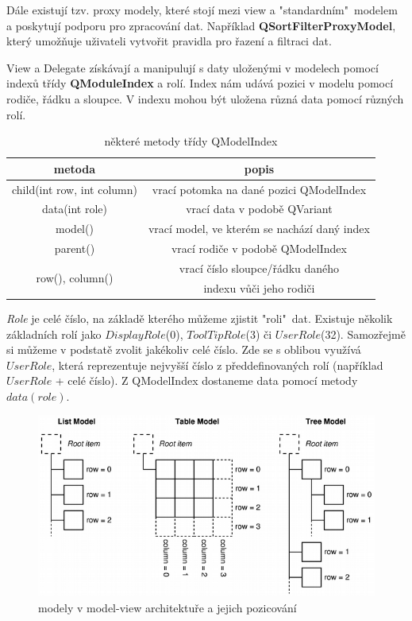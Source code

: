 Dále existují tzv. proxy modely, které stojí mezi view a
"standardním"~modelem a poskytují podporu pro zpracování dat.
Například \textbf{QSortFilterProxyModel}, který umožňuje uživateli
vytvořit pravidla pro řazení a filtraci dat.

View a Delegate získávají a manipulují s daty uloženými v modelech
pomocí indexů třídy \textbf{QModuleIndex} a rolí. Index nám udává
pozici v modelu pomocí rodiče, řádku a sloupce. V indexu mohou být
uložena různá data pomocí různých rolí.

\begin{table}[h]
	\centering
	\begin{tabular}{|c|c|}
		\hline	
		{\bf metoda} & {\bf popis} \\
		\hline
		\hline
		child(int row, int column) & vrací potomka na dané pozici QModelIndex \\
		\hline
		data(int role) & vrací data v podobě QVariant \\
		\hline
		model() & vrací model, ve kterém se nachází daný index \\
		\hline
		parent() & vrací rodiče v podobě QModelIndex \\
		\hline
	 	\multirow{2}{*}{row(), column()} & vrací číslo sloupce/řádku daného \\ 
		 & indexu vůči jeho rodiči \\
		\hline
	\end{tabular}
	\caption{některé metody třídy QModelIndex}
	\label{tab:qmodelindex}
\end{table}

\textit{Role} je celé číslo, na základě kterého můžeme zjistit "roli"~dat. Existuje několik základních rolí jako $DisplayRole$(0), $ToolTipRole$(3) či $UserRole$(32). Samozřejmě si můžeme v podstatě zvolit jakékoliv celé číslo. Zde se s oblibou využívá $UserRole$, která reprezentuje nejvyšší číslo z předdefinovaných rolí (například $UserRole$ + celé číslo). Z QModelIndex dostaneme data pomocí metody $data(role)$.

\begin{figure}[h]
	\centering
	\includegraphics[scale=0.7]{pictures/qt/mv_models}
	\caption{modely v model-view architektuře a jejich pozicování}
	\label{mvModels}
\end{figure} 


